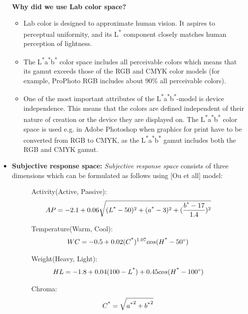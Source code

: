 \begin{itemize}
\textbf{Why did we use Lab color space? }\\
\begin{itemize} 
\item{Lab color is designed to approximate human vision. It aspires to perceptual uniformity, and its L\textsuperscript{*} component closely matches human perception of lightness.}
\item{The L\textsuperscript{*}a\textsuperscript{*}b\textsuperscript{*} color space includes all perceivable colors which means that its gamut exceeds those of the RGB and CMYK color models (for example, ProPhoto RGB includes about 90\% all perceivable colors).}
\item{One of the most important attributes of the L\textsuperscript{*}a\textsuperscript{*}b\textsuperscript{*}-model is device independence. This means that the colors are defined independent of their nature of creation or the device they are displayed on. The L\textsuperscript{*}a\textsuperscript{*}b\textsuperscript{*} color space is used e.g. in Adobe Photoshop when graphics for print have to be converted from RGB to CMYK, as the L\textsuperscript{*}a\textsuperscript{*}b\textsuperscript{*} gamut includes both the RGB and CMYK gamut.}
\end{itemize}

\item{\textbf{Subjective response space: }} \textit{Subjective response space} consists of three dimensions which can be formulated as follows using [Ou et all] model:


\begin{figure}[!htb]
Activity(Active, Passive):
\[ AP = -2.1+0.06\sqrt{(L\textsuperscript{*}-50)^{2} + (a\textsuperscript{*}-3)^{2} + (\frac{b\textsuperscript{*}-17}{1.4})^{2}} \]
\end{figure}


\begin{figure}[!htb]
Temperature(Warm, Cool):
\[ WC = -0.5+0.02(C\textsuperscript{*})^{1.07}cos(H\textsuperscript{*} - 50^{\circ} ) \]
\end{figure}  


\begin{figure}[!htb]
Weight(Heavy, Light):
\[ HL = -1.8+0.04(100-L\textsuperscript{*}) + 0.45cos(H\textsuperscript{*}-100^{\circ} ) \]
\end{figure}


\begin{figure}[!htb]
Chroma:
\[ C\textsuperscript{*} = \sqrt{a\textsuperscript{*}^2 + b\textsuperscript{*}^2}\]
\end{figure}



\end{itemize}
